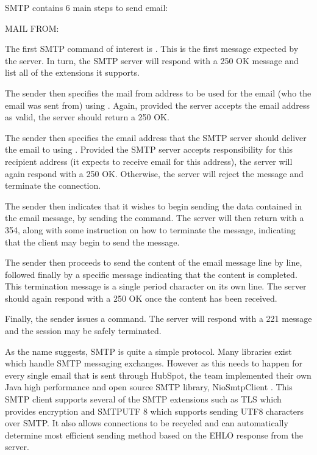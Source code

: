 SMTP contains 6 main steps to send email:
\begin{labeling}{MAIL FROM: }
  \item[EHLO] The first SMTP command of interest is . This is the first message expected by the server. In turn, the SMTP server will respond with a 250 OK message and list all of the extensions it supports. 
  \item[MAIL FROM:] The sender then specifies the mail from address to be used for the email (who the email was sent from) using . Again, provided the server accepts the email address as valid, the server should return a 250 OK.
  \item[RCPT TO:] The sender then specifies the email address that the SMTP server should deliver the email to using . Provided the SMTP server accepts responsibility for this recipient address (it expects to receive email for this address), the server will again respond with a 250 OK. Otherwise, the server will reject the message and terminate the connection.
  \item[DATA] The sender then indicates that it wishes to begin sending the data contained in the email message, by sending the  command. The server will then return with a 354, along with some instruction on how to terminate the message, indicating that the client may begin to send the message.
  \item[<content>] The sender then proceeds to send the content of the email message line by line, followed finally by a specific message indicating that the content is completed. This termination message is a single period character on its own line. The server should again respond with a 250 OK once the content has been received.
  \item[QUIT] Finally, the sender issues a  command. The server will respond with a 221 message and the session may be safely terminated.
\end{labeling}

As the name suggests, SMTP is quite a simple protocol. Many libraries exist which handle SMTP messaging exchanges. However as this needs to happen for every single email that is sent through HubSpot, the \team{} team implemented their own Java high performance and open source SMTP library, NioSmtpClient \cite{hubspotSmtp}. This SMTP client supports several of the SMTP extensions such as TLS which provides encryption and SMTPUTF 8 which supports sending UTF8 characters over SMTP. It also allows connections to be recycled and can automatically determine most efficient sending method based on the EHLO response from the server.     

